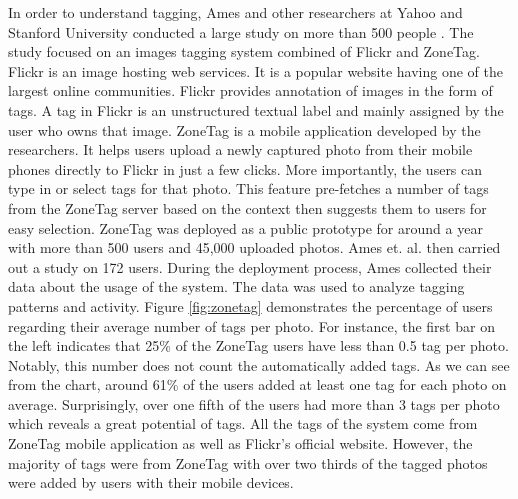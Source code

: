 In order to understand tagging, Ames and other researchers at Yahoo and Stanford University conducted a large study on more than 500 people \cite{ames2007we}. The study focused on an images tagging system combined of Flickr and ZoneTag. Flickr is an image hosting web services. It is a popular website having one of the largest online communities. Flickr provides annotation of images in the form of tags. A tag in Flickr is an unstructured textual label and mainly assigned by the user who owns that image. ZoneTag is a mobile application developed by the researchers. It helps users upload a newly captured photo from their mobile phones directly to Flickr in just a few clicks. More importantly, the users can type in or select tags for that photo. This feature pre-fetches a number of tags from the ZoneTag server based on the context then suggests them to users for easy selection. ZoneTag was deployed as a public prototype for around a year with more than 500 users and 45,000 uploaded photos. Ames et. al. then carried out a study on 172 users. During the deployment process, Ames collected their data about the usage of the system. The data was used to analyze tagging patterns and activity. Figure \ref{fig:zonetag} demonstrates the percentage of users regarding their average number of tags per photo. For instance, the first bar on the left indicates that 25\% of the ZoneTag users have less than 0.5 tag per photo. Notably, this number does not count the automatically added tags. As we can see from the chart, around 61\% of the users added at least one tag for each photo on average. Surprisingly, over one fifth of the users had more than 3 tags per photo which reveals a great potential of tags. All the tags of the system come from ZoneTag mobile application as well as Flickr's official website. However, the majority of tags were from ZoneTag with over two thirds of the tagged photos were added by users with their mobile devices.

